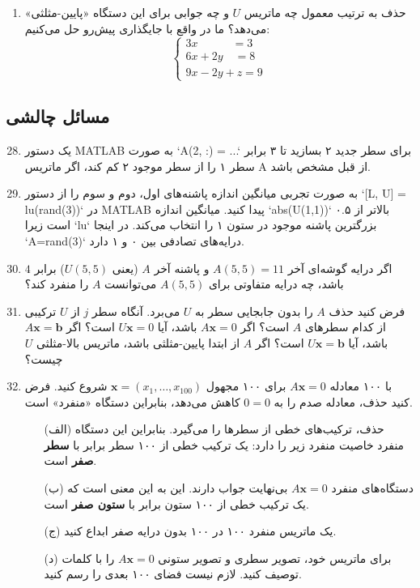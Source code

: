 \documentclass[12pt, a4paper]{book}
\theoremstyle{translator}
\begin{document}
\begin{enumerate}
		\item حذف به ترتیب معمول چه ماتریس $U$ و چه جوابی برای این دستگاه «پایین-مثلثی» می‌دهد؟ ما در واقع با جایگذاری پیش‌رو حل می‌کنیم:
		\[
		\begin{cases}
			3x \qquad \quad = 3 \\
			6x + 2y \quad = 8 \\
			9x - 2y + z = 9
		\end{cases}
		\]
	\end{enumerate}
	
	\subsection*{مسائل چالشی}
	\begin{enumerate}
		\setcounter{enumi}{27}
		\item یک دستور MATLAB به صورت `A(2, :) = ...` برای سطر جدید ۲ بسازید تا ۳ برابر سطر ۱ را از سطر موجود ۲ کم کند، اگر ماتریس A از قبل مشخص باشد.
		
		\item به صورت تجربی میانگین اندازه پاشنه‌های اول، دوم و سوم را از دستور `[L, U] = lu(rand(3))` در MATLAB پیدا کنید. میانگین اندازه `abs(U(1,1))` بالاتر از ۰.۵ است زیرا `lu` بزرگترین پاشنه موجود در ستون ۱ را انتخاب می‌کند. در اینجا `A=rand(3)` درایه‌های تصادفی بین ۰ و ۱ دارد.
		
		\item اگر درایه گوشه‌ای آخر $A(5,5)=11$ و پاشنه آخر $A$ (یعنی $U(5,5)$) برابر $4$ باشد، چه درایه متفاوتی برای $A(5,5)$ می‌توانست $A$ را منفرد کند؟
		
		\item فرض کنید حذف $A$ را بدون جابجایی سطر به $U$ می‌برد. آنگاه سطر $j$ از $U$ ترکیبی از کدام سطرهای $A$ است؟ اگر $A\mathbf{x}=0$ باشد، آیا $U\mathbf{x}=0$ است؟ اگر $A\mathbf{x}=\mathbf{b}$ باشد، آیا $U\mathbf{x}=\mathbf{b}$ است؟ اگر $A$ از ابتدا پایین-مثلثی باشد، ماتریس بالا-مثلثی $U$ چیست؟
		
		\item با ۱۰۰ معادله $A\mathbf{x}=0$ برای ۱۰۰ مجهول $\mathbf{x}=(x_1, \dots, x_{100})$ شروع کنید. فرض کنید حذف، معادله صدم را به $0=0$ کاهش می‌دهد، بنابراین دستگاه «منفرد» است.
		\begin{itemize}
			\item[(الف)] حذف، ترکیب‌های خطی از سطرها را می‌گیرد. بنابراین این دستگاه منفرد خاصیت منفرد زیر را دارد: یک ترکیب خطی از ۱۰۰ سطر برابر با \textbf{سطر صفر} است.
			\item[(ب)] دستگاه‌های منفرد $A\mathbf{x}=0$ بی‌نهایت جواب دارند. این به این معنی است که یک ترکیب خطی از ۱۰۰ ستون برابر با \textbf{ستون صفر} است.
			\item[(ج)] یک ماتریس منفرد ۱۰۰ در ۱۰۰ بدون درایه صفر ابداع کنید.
			\item[(د)] برای ماتریس خود، تصویر سطری و تصویر ستونی $A\mathbf{x}=0$ را با کلمات توصیف کنید. لازم نیست فضای ۱۰۰ بعدی را رسم کنید.
		\end{itemize}
	\end{enumerate}
	
\end{document}

